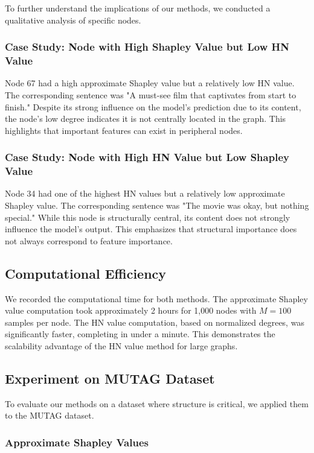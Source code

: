 \documentclass{article}
\begin{document}
To further understand the implications of our methods, we conducted a qualitative analysis of specific nodes.

\subsubsection{Case Study: Node with High Shapley Value but Low HN Value}

Node 67 had a high approximate Shapley value but a relatively low HN value. The corresponding sentence was "A must-see film that captivates from start to finish." Despite its strong influence on the model's prediction due to its content, the node's low degree indicates it is not centrally located in the graph. This highlights that important features can exist in peripheral nodes.

\subsubsection{Case Study: Node with High HN Value but Low Shapley Value}

Node 34 had one of the highest HN values but a relatively low approximate Shapley value. The corresponding sentence was "The movie was okay, but nothing special." While this node is structurally central, its content does not strongly influence the model's output. This emphasizes that structural importance does not always correspond to feature importance.

\subsection{Computational Efficiency}

We recorded the computational time for both methods. The approximate Shapley value computation took approximately 2 hours for 1,000 nodes with $M = 100$ samples per node. The HN value computation, based on normalized degrees, was significantly faster, completing in under a minute. This demonstrates the scalability advantage of the HN value method for large graphs.

\subsection{Experiment on MUTAG Dataset}

To evaluate our methods on a dataset where structure is critical, we applied them to the MUTAG dataset.

\subsubsection{Approximate Shapley Values}
\end{document}
